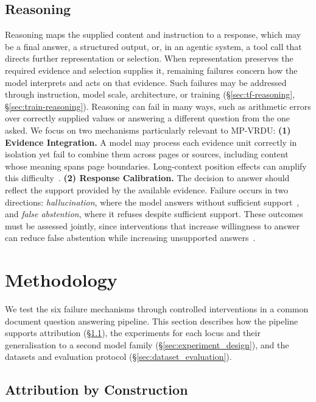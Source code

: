 \subsection{Reasoning}
\label{sec:fm_reasoning}

Reasoning maps the supplied content and instruction to a response, which may be a final answer, a structured output, or, in an agentic system, a tool call that directs further representation or selection. When representation preserves the required evidence and selection supplies it, remaining failures concern how the model interprets and acts on that evidence. Such failures may be addressed through instruction, model scale, architecture, or training (\S\ref{sec:tf-reasoning}, \S\ref{sec:train-reasoning}). Reasoning can fail in many ways, such as arithmetic errors over correctly supplied values or answering a different question from the one asked. We focus on two mechanisms particularly relevant to MP-VRDU:
\textbf{(1) Evidence Integration.} A model may process each evidence unit correctly in isolation yet fail to combine them across pages or sources, including content whose meaning spans page boundaries. Long-context position effects can amplify this difficulty~\citep{liu2024lost}.
\textbf{(2) Response Calibration.} The decision to answer should reflect the support provided by the available evidence. Failure occurs in two directions: \emph{hallucination}, where the model answers without sufficient support~\citep{li2023survey}, and \emph{false abstention}, where it refuses despite sufficient support. These outcomes must be assessed jointly, since interventions that increase willingness to answer can reduce false abstention while increasing unsupported answers~\citep{whitehead2022reliable}.

\section{Methodology}
\label{sec:emp_methodology}
We test the six failure mechanisms through controlled interventions in a common document question answering pipeline. This section describes how the pipeline supports attribution (\S\ref{sec:attribution}), the experiments for each locus and their generalisation to a second model family (\S\ref{sec:experiment_design}), and the datasets and evaluation protocol (\S\ref{sec:dataset_evaluation}).

\subsection{Attribution by Construction}
\label{sec:attribution}

